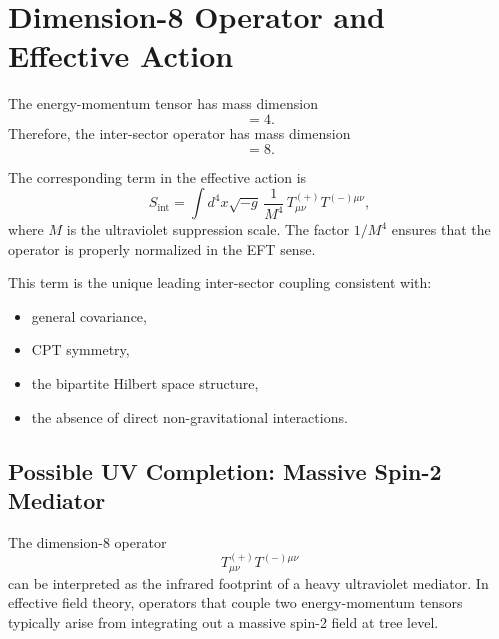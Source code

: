 \documentclass[11pt,a4paper]{article}
\begin{document}
\section[Dimension-8 Operator]{Dimension-8 Operator and Effective Action}

The energy-momentum tensor has mass dimension
\begin{equation}
[T_{\mu\nu}] = 4.
\end{equation}
Therefore, the inter-sector operator has mass dimension
\begin{equation}
[T^{(+)}_{\mu\nu} T^{(-)\mu\nu}] = 8.
\end{equation}

The corresponding term in the effective action is
\begin{equation}
S_{\mathrm{int}}
=
\int d^4x \sqrt{-g} \,
\frac{1}{M^4} \,
T^{(+)}_{\mu\nu} T^{(-)\mu\nu},
\label{eq:dim8action}
\end{equation}
where $M$ is the ultraviolet suppression scale. The factor $1/M^4$ ensures
that the operator is properly normalized in the EFT sense.

This term is the unique leading inter-sector coupling consistent with:
\begin{itemize}[leftmargin=0.8cm]
  \item general covariance,
  \item CPT symmetry,
  \item the bipartite Hilbert space structure,
  \item the absence of direct non-gravitational interactions.
\end{itemize}


\subsection[Possible UV Completion]{Possible UV Completion: Massive Spin-2 Mediator}

The dimension-8 operator
\begin{equation}
T^{(+)}_{\mu\nu} T^{(-)\mu\nu}
\end{equation}
can be interpreted as the infrared footprint of a heavy ultraviolet mediator.
In effective field theory, operators that couple two energy-momentum tensors
typically arise from integrating out a massive spin-2 field at tree level.
\end{document}
